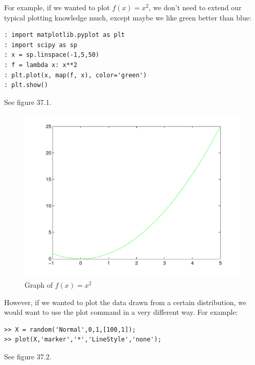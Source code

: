 For example, if we wanted to plot $f(x) = x^2$, we don't need to extend our typical plotting knowledge much, except maybe we like green better than blue:

\begin{lstlisting}[style=python]
: import matplotlib.pyplot as plt
: import scipy as sp
: x = sp.linspace(-1,5,50)
: f = lambda x: x**2
: plt.plot(x, map(f, x), color='green')
: plt.show()
\end{lstlisting}

See figure 37.1.

\begin{figure}
\begin{center}
\includegraphics[scale=0.5]{./FiguresMAT/plot1}
\caption{Graph of $f(x) = x^2$}
\end{center}
\end{figure}


However, if we wanted to plot the data drawn from a certain distribution, we would want to use the plot command in a very different way.  For example:

\begin{lstlisting}[style=python]
>> X = random('Normal',0,1,[100,1]);
>> plot(X,'marker','*','LineStyle','none');
\end{lstlisting}

See figure 37.2.

